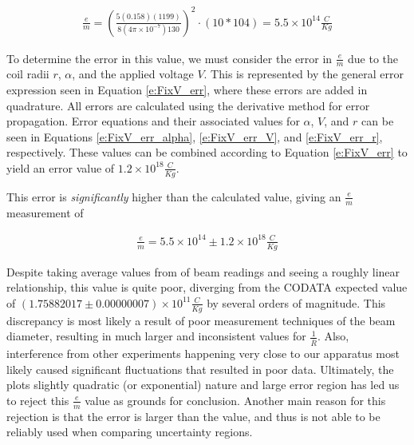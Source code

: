 \documentclass[12pt]{article}
\newcommand{\paren}[1]{\left( {#1} \right)}
\begin{document}
\begin{align*}
	\frac{e}{m}=\paren{\frac{5(0.158)(1199)}{8(4\pi\times10^{-7})130}}^2\cdot(10*104)=5.5\times10^{14} \frac{C}{Kg}
\end{align*}

To determine the error in this value, we must consider the error in $\frac{e}{m}$ due to the coil radii $r$, $\alpha$, and the applied voltage $V$. This is represented by the general error expression seen in Equation \ref{e:FixV_err}, where these errors are added in quadrature. All errors are calculated using the derivative method for error propagation. Error equations and their associated values for $\alpha$, $V$, and $r$ can be seen in Equations \ref{e:FixV_err_alpha}, \ref{e:FixV_err_V}, and \ref{e:FixV_err_r}, respectively. These values can be combined according to Equation \ref{e:FixV_err} to yield an error value of $1.2\times10^{18} \frac{C}{Kg}$.

This error is \textit{significantly} higher than the calculated value, giving an $\frac{e}{m}$ measurement of 

\begin{align*}
	\frac{e}{m}=5.5\times10^{14}\pm1.2\times10^{18} \frac{C}{Kg}
\end{align*}

Despite taking average values from of beam readings and seeing a roughly linear relationship, this value is quite poor, diverging from the CODATA expected value of $(1.75882017\pm0.00000007)\times10^{11} \frac{C}{Kg}$ by several orders of magnitude. This discrepancy is most likely a result of poor measurement techniques of the beam diameter, resulting in much larger and inconsistent values for $\frac{1}{\bar{R}}$. Also, interference from other experiments happening very close to our apparatus most likely caused significant fluctuations that resulted in poor data. Ultimately, the plots slightly quadratic (or exponential) nature and large error region has led us to reject this $\frac{e}{m}$ value as grounds for conclusion. Another main reason for this rejection is that the error is larger than the value, and thus is not able to be reliably used when comparing uncertainty regions.
\end{document}
